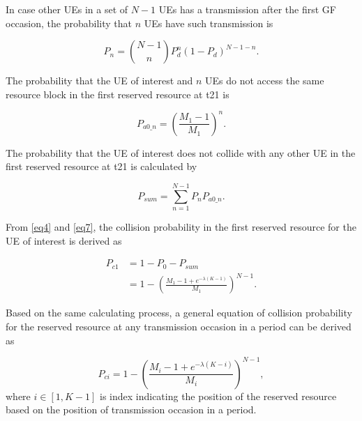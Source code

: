 \documentclass[conference]{IEEEtran}
\begin{document}
In case other UEs in a set of $N-1$ UEs has a transmission after the first GF occasion, the probability that $n$  UEs have such transmission is \useshortskip

\begin{equation}
P_{n} = \binom {N-1}{n}P_{d}^{n}(1-P_{d})^{N-1-n}.\label{eq5}
\end{equation}

The probability that the UE of interest and $n$ UEs do not access the same resource block in the first reserved resource at t21 is \useshortskip

\begin{equation}
P_{a0\_n} = (\frac {M_{1}-1}{M_{1}})^{n}.\label{eq6}
\end{equation}

The probability that the UE of interest does not collide with any other UE in the first reserved resource at t21 is calculated by \useshortskip

\begin{equation}
P_{sum} = \sum_{n=1}^{N-1} P_{n}P_{a0\_n}.\label{eq7}
\end{equation}

From \eqref{eq4} and \eqref{eq7}, the collision probability in the first reserved resource for the UE of interest is derived as \useshortskip

\begin{align}
P_{c1} &= 1 - P_{0} - P_{sum} \nonumber\\
 &= 1 - (\frac{M_{1}-1+e^{-\lambda(K-1)}}{M_{1}})^{N-1}.\label{eq8}
\end{align}

Based on the same calculating process, a general equation of collision probability for the reserved resource at any transmission occasion in a period can be derived as \useshortskip

\begin{equation}
P_{ci} = 1 - (\frac{M_{i}-1+e^{-\lambda(K-i)}}{M_{i}})^{N-1},\label{eq9}
\end{equation}
where
$i \in [1, K-1]$ is index indicating the position of the reserved resource based on the position of transmission occasion in a period.
\end{document}
